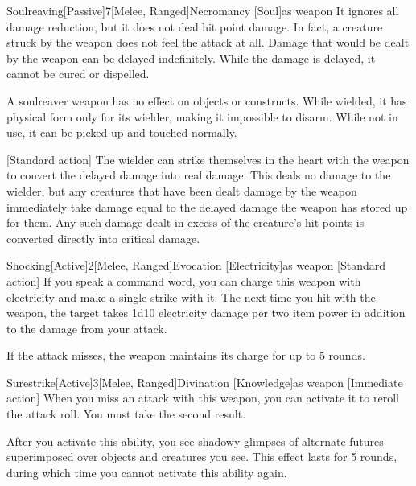             \begin{magicitemdef}{Soulreaving}[Passive]{7}[Melee, Ranged]{Necromancy [Soul]}{as weapon}
                 It ignores all damage reduction, but it does not deal hit point damage.
                In fact, a creature struck by the weapon does not feel the attack at all.
                Damage that would be dealt by the weapon can be delayed indefinitely.
                While the damage is delayed, it cannot be cured or dispelled.

                A soulreaver weapon has no effect on objects or constructs.
                While wielded, it has physical form only for its wielder, making it impossible to disarm.
                While not in use, it can be picked up and touched normally.

                [Standard action] The wielder can strike themselves in the heart with the weapon to convert the delayed damage into real damage.
                This deals no damage to the wielder, but any creatures that have been dealt damage by the weapon immediately take damage equal to the delayed damage the weapon has stored up for them.
                Any such damage dealt in excess of the creature's hit points is converted directly into critical damage.
            \end{magicitemdef}

            \begin{magicitemdef}{Shocking}[Active]{2}[Melee, Ranged]{Evocation [Electricity]}{as weapon}
                [Standard action] If you speak a command word, you can charge this weapon with electricity and make a single strike with it.
                The next time you hit with the weapon, the target takes 1d10 electricity damage per two item power in addition to the damage from your attack.

                If the attack misses, the weapon maintains its charge for up to 5 rounds.
            \end{magicitemdef}

            \begin{magicitemdef}{Surestrike}[Active]{3}[Melee, Ranged]{Divination [Knowledge]}{as weapon}
                [Immediate action] When you miss an attack with this weapon, you can activate it to reroll the attack roll.
                You must take the second result.

                After you activate this ability, you see shadowy glimpses of alternate futures superimposed over objects and creatures you see.
                This effect lasts for 5 rounds, during which time you cannot activate this ability again.
            \end{magicitemdef}

